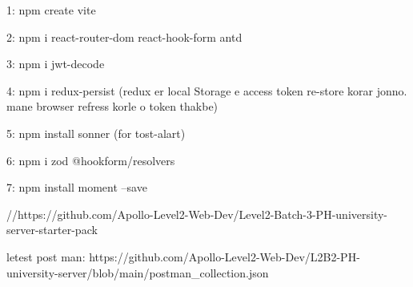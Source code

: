 1: npm create vite

2: npm i react-router-dom react-hook-form antd

3: npm i jwt-decode

4: npm i redux-persist (redux er local Storage e access token re-store korar jonno. mane browser refress korle o token thakbe)

5: npm install sonner (for tost-alart)

6: npm i zod @hookform/resolvers

7: npm install moment --save

//https://github.com/Apollo-Level2-Web-Dev/Level2-Batch-3-PH-university-server-starter-pack

letest post man: https://github.com/Apollo-Level2-Web-Dev/L2B2-PH-university-server/blob/main/postman_collection.json